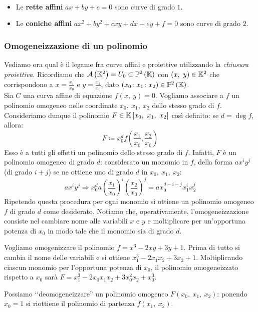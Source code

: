 \begin{define}~{}
	\begin{itemize}
		\item Le \textbf{rette affini} $ax+by+c=0$ sono curve di grado $1$.
		\item Le \textbf{coniche affini} $ax^2+by^2+cxy+dx+ey+f=0$ sono curve di grado $2$.
	\end{itemize}
	\vspace{-3mm}
\end{define}
\subsubsection{Omogeneizzazione di un polinomio}
Vediamo ora qual è il legame fra curve affini e proiettive utilizzando la \textit{chiusura proiettiva}. Ricordiamo che $\aff{\kamp^2}=U_0\subset \proj[2]{\kamp}$ con $\left(x,\ y\right)\in\mathbb{K}^2$ che corrispondono a $\displaystyle x=\frac{x_1}{x_0}$ e $\displaystyle y=\frac{x_2}{x_0}$, dato $(x_0\colon x_1\colon x_2)\in\proj[2]{\kamp}$.\\
Sia $C$ una curva affine di equazione $f\left(x,\ y\right)=0$. Vogliamo associare a $f$ un polinomio omogeneo nelle coordinate $x_0,\ x_1,\ x_2$ dello stesso grado di $f$.
Consideriamo dunque il polinomio $F\in\mathbb{K}\left[x_0,\ x_1,\ x_2\right]$ così definito: se $d=\deg f$, allora:
\begin{equation}
	F\coloneqq x_0^d f\left( \frac{x_1}{x_0}, \frac{x_2}{x_0} \right)
\end{equation}
Esso è a tutti gli effetti un polinomio dello stesso grado di $f$. Infatti, $F$ è un polinomio omogeneo di grado $d$: considerato un monomio in $f$, della forma $ax^iy^j$ (di grado $i+j$) se ne ottiene uno di grado $d$ in $x_0,\ x_1,\ x_2$:
	\begin{equation*}
		ax^iy^j \Longrightarrow x_0^d a \left( \frac{x_1}{x_0} \right)^i \left( \frac{x_2}{x_0} \right)^j = ax_0^{d-i-j} x_1^i x_2^j
	\end{equation*}
Ripetendo questa procedura per ogni monomio si ottiene un polinomio omogeneo $f$ di grado $d$ come desiderato. Notiamo che, operativamente, l'omogeneizzazione consiste nel cambiare nome alle variabili $x$ e $y$ e moltiplicare per un'opportuna potenza di $x_0$ in modo tale che il monomio sia di grado $d$.
\begin{example} Vogliamo omogenizzare il polinomio $f=x^3-2xy+3y+1$. Prima di tutto si cambia il nome delle variabili e si ottiene $x_1^3-2x_1x_2+3x_2+1$. Moltiplicando ciascun monomio per l'opportuna potenza di $x_0$, il polinomio omogeneizzato rispetto a $x_0$ sarà $F=x_1^3-2x_0x_1x_2 +3x_0^2x_2+x_0^3$.
\end{example}
\begin{observe}
	Possiamo ‘‘deomogeneizzare'' un polinomio omogeneo $F(x_0,\ x_1,\ x_2)$: ponendo $x_0=1$ si riottiene il polinomio di partenza $f(x_1,\ x_2)$.
\end{observe}
